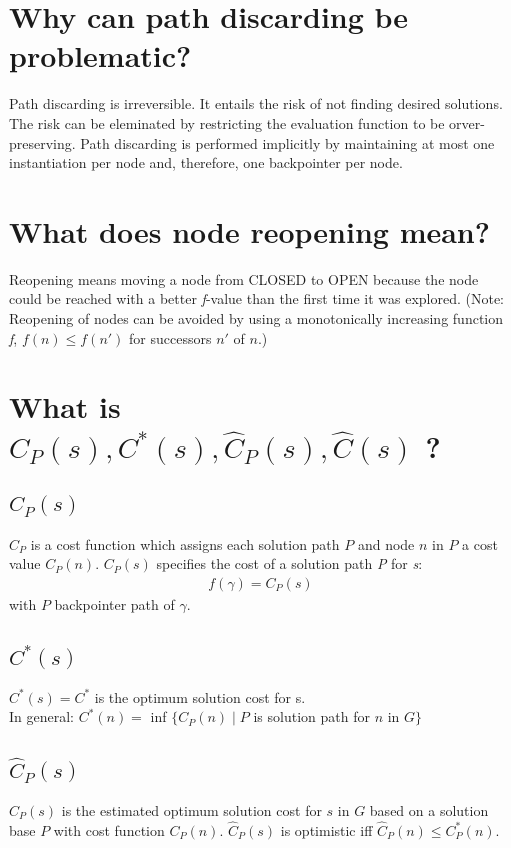 \documentclass[12pt, a4paper]{article}
\begin{document}
\section{Why can path discarding be problematic?}
Path discarding is irreversible. It entails the risk of not finding desired solutions. The risk can be eleminated by restricting the evaluation function to be orver-preserving. Path discarding is performed implicitly by maintaining at most one instantiation per node and, therefore, one backpointer per node.

\section{What does node reopening mean?}
Reopening means moving a node from CLOSED to OPEN because the node could be reached with a better \textit{f}-value than the first time it was explored. (Note: Reopening of nodes can be avoided by using a monotonically increasing function \textit{f}, $f(n) \leq f(n')$ for successors $n'$ of $n$.)

\section{What is $C_P(s), C^*(s), \hat{C}_P(s), \hat{C}(s)$ ?}
\subsection{$C_P(s)$}
$C_P$ is a cost function which assigns each solution path $P$ and node $n$ in $P$ a cost value $C_P(n)$. $C_P(s)$  specifies the cost of a solution path  \textit{P} for \textit{s}: 
\begin{align*}
f(\gamma) = C_P(s)
\end{align*}
with $P$ backpointer path of $\gamma$.

\subsection{$C^*(s)$}
$C^*(s) = C^*$ is the optimum solution cost for s. \\
In general: $C^*(n) = $ inf $\{C_P(n) \mid P $ is solution path for $n$ in $G\}$ 

\subsection{$\hat{C}_P(s)$}
$\hat{C}_P(s)$ is the estimated optimum solution cost for $s$ in $G$ based on a solution base $P$ with cost function $C_P(n)$.
$\hat{C}_P(s)$ is optimistic iff $\hat{C}_P(n) \leq  C^*_P(n)$.
\end{document}
